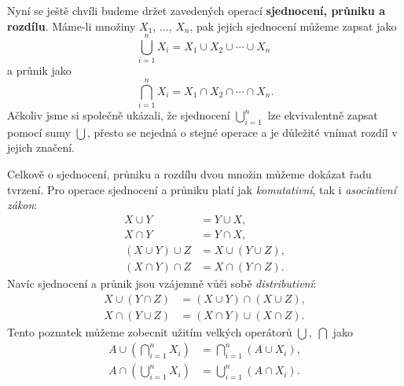 Nyní se ještě chvíli budeme držet zavedených operací \textbf{sjednocení, průniku a rozdílu}. Máme-li množiny $X_1,\,\dots,\,X_n$, pak jejich sjednocení můžeme zapsat jako
\begin{equation*}
    \bigcup\limits_{i=1}^{n}{X_i}=X_1 \cup X_2 \cup \cdots \cup X_n\;
\end{equation*}
a průnik jako
\begin{equation*}
    \bigcap\limits_{i=1}^{n}{X_i}=X_1 \cap X_2 \cap \cdots \cap X_n.
\end{equation*}
Ačkoliv jsme si společně ukázali, že sjednocení $\bigcup_{i=1}^{n}$ lze ekvivalentně zapsat pomocí sumy $\bigcup$, přesto se nejedná o stejné operace a je důležité vnímat rozdíl v jejich značení.\par
Celkově o sjednocení, průniku a rozdílu dvou množin můžeme dokázat řadu tvrzení. Pro operace sjednocení a průniku platí jak \emph{komutativní}, tak i \emph{asociativní zákon}:
\begin{align*}
    X \cup Y&=Y \cup X,\\
    X \cap Y&=Y \cap X,\\
    (X \cup Y) \cup Z &= X \cup (Y \cup Z),\\
    (X \cap Y) \cap Z &= X \cap (Y \cap Z).
\end{align*}
Navíc sjednocení a průnik jsou vzájemně vůči sobě \emph{distributivní}:
\begin{align*}
    X \cup (Y \cap Z) &= (X \cup Y) \cap (X \cup Z),\\
    X \cap (Y \cup Z) &= (X \cap Y) \cup (X \cap Z).
\end{align*}
Tento poznatek můžeme zobecnit užitím velkých operátorů $\bigcup,\;\bigcap$ jako
\begin{align*}
    A \cup \left(\bigcap\limits_{i=1}^{n}{X_i}\right)&=\bigcap\limits_{i=1}^{n}{(A \cup X_i)},\\
    A \cap \left(\bigcup\limits_{i=1}^{n}{X_i}\right)&=\bigcup\limits_{i=1}^{n}{(A \cap X_i)}.
\end{align*}

